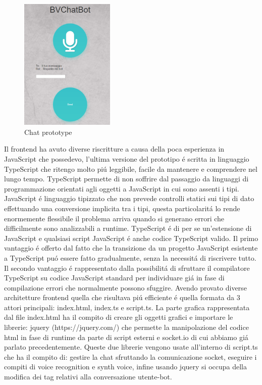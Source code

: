 \begin{figure}[H]
 \centering
  \includegraphics[width=0.4\textwidth]{img/prototype.png}
 \caption{Chat prototype}
\end{figure}
Il frontend ha avuto diverse riscritture a causa della poca esperienza in JavaScript che possedevo, l'ultima versione del prototipo \'e scritta in linguaggio TypeScript che ritengo molto pi\'u leggibile, facile da mantenere e comprendere nel lungo tempo. 
TypeScript permette di non soffrire dal passaggio da linguaggi di programmazione orientati agli oggetti a JavaScript in cui sono assenti i tipi. JavaScript \'e linguaggio tipizzato che non prevede controlli statici sui tipi di dato effettuando una conversione implicita tra i tipi, questa particolarit\'a lo rende enormemente flessibile il problema arriva quando si generano errori che difficilmente sono analizzabili a runtime. 
TypeScript \'e di per se un'estensione di JavaScript e qualsiasi script JavaScript \'e anche codice TypeScript valido. Il primo vantaggio \'e offerto dal fatto che la transizione da un progetto JavaScript esistente a TypeScript pu\'o essere fatto gradualmente, senza la necessit\'a di riscrivere tutto. Il secondo vantaggio \'e rappresentato dalla possibilit\'a di sfruttare il compilatore TypeScript su codice JavaScript standard per individuare gi\'a in fase di compilazione errori che normalmente possono sfuggire.
Avendo provato diverse architetture frontend quella che risultava pi\'u efficiente \'e quella formata da 3 attori principali: index.html, index.ts e script.ts.
La parte grafica rappresentata dal file index.html ha il compito di creare gli oggetti grafici e importare le librerie: jquery (https://jquery.com/) che permette la manipolazione del codice html in fase di runtime da parte di script esterni e socket.io di cui abbiamo gi\'a parlato precedentemente.
Queste due librerie vengono usate all'interno di script.ts che ha il compito di: gestire la chat sfruttando la comunicazione socket, eseguire i compiti di voice recognition e synth voice, infine usando jquery si occupa della modifica dei tag relativi alla conversazione utente-bot. 
